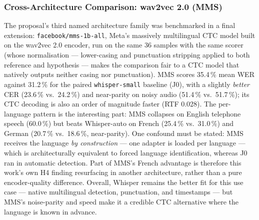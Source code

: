 \documentclass[12pt]{report}
\begin{document}
\subsubsection{Cross-Architecture Comparison: wav2vec 2.0 (MMS)}
The proposal's third named architecture family was benchmarked in a final extension: \texttt{facebook/mms-1b-all}, Meta's massively multilingual CTC model built on the wav2vec 2.0 encoder, run on the same 36 samples with the same scorer (whose normalisation --- lower-casing and punctuation stripping applied to both reference and hypothesis --- makes the comparison fair to a CTC model that natively outputs neither casing nor punctuation). MMS scores 35.4\,\% mean WER against 31.2\,\% for the paired \texttt{whisper-small} baseline (J0), with a slightly \emph{better} CER (23.6\,\% vs.\ 24.2\,\%) and near-parity on noisy audio (51.4\,\% vs.\ 51.7\,\%); its CTC decoding is also an order of magnitude faster (RTF 0.028). The per-language pattern is the interesting part: MMS collapses on English telephone speech (60.0\,\%) but beats Whisper-auto on French (25.4\,\% vs.\ 31.0\,\%) and German (20.7\,\% vs.\ 18.6\,\%, near-parity). One confound must be stated: MMS receives the language \emph{by construction} --- one adapter is loaded per language --- which is architecturally equivalent to forced language identification, whereas J0 ran in automatic detection. Part of MMS's French advantage is therefore this work's own H4 finding resurfacing in another architecture, rather than a pure encoder-quality difference. Overall, Whisper remains the better fit for this use case --- native multilingual detection, punctuation, and timestamps --- but MMS's noise-parity and speed make it a credible CTC alternative where the language is known in advance.
\end{document}
